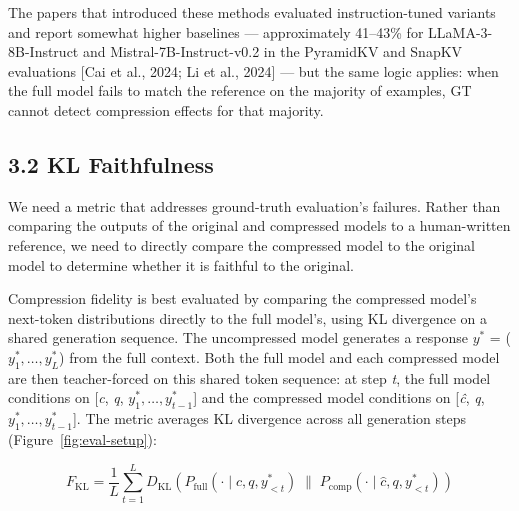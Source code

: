 \documentclass[10pt,letterpaper]{article}
\begin{document}
\begin{itemize}
  The papers that introduced these methods evaluated instruction-tuned
  variants and report somewhat higher baselines --- approximately 41--43\%
  for LLaMA-3-8B-Instruct and Mistral-7B-Instruct-v0.2 in the PyramidKV
  and SnapKV evaluations {[}Cai et al., 2024; Li et al., 2024{]} --- but
  the same logic applies: when the full model fails to match the reference
  on the majority of examples, GT cannot detect compression effects for
  that majority.

\end{itemize}


\hypertarget{kl-faithfulness}{%
\subsection{3.2 KL Faithfulness}\label{kl-faithfulness}}

We need a metric that addresses ground-truth evaluation's failures. Rather than comparing
the outputs of the original and compressed models to a human-written reference,
we need to directly compare the compressed model to the original model to determine
whether it is faithful to the original.

Compression fidelity is best evaluated by comparing the compressed model's next-token
distributions directly to the full model's, using KL divergence on a shared
generation sequence. The uncompressed model generates a response \(y^*\)
= (\(y^*_1, \ldots, y^*_L\)) from the full context. Both the full model
and each compressed model are then teacher-forced on this shared token
sequence: at step \emph{t}, the full model conditions on {[}\emph{c},
\emph{q}, \(y^*_1, \ldots, y^*_{t-1}\){]} and the compressed model
conditions on {[}\emph{ĉ}, \emph{q}, \(y^*_1, \ldots, y^*_{t-1}\){]}.
The metric averages KL divergence across all generation steps
(Figure~\ref{fig:eval-setup}):

\[
F_{\text{KL}} = \frac{1}{L} \sum_{t=1}^{L}
  D_{\text{KL}}\!\left(
    P_{\text{full}}(\cdot \mid c, q, y^*_{<t})
    \;\bigg\|\;
    P_{\text{comp}}(\cdot \mid \hat{c}, q, y^*_{<t})
  \right)
\]
\end{document}
